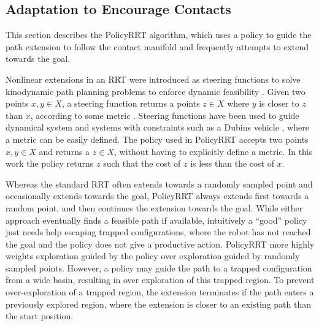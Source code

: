 \documentclass[../thesis.tex]{subfiles}
\begin{document}
\subsection{Adaptation to Encourage Contacts}
This section describes the PolicyRRT algorithm, which uses a policy to guide the path extension to follow the contact manifold and frequently attempts to extend towards the goal.

Nonlinear extensions in an RRT were introduced as steering functions to solve kinodynamic path planning problems to enforce dynamic feasibility \cite{lavalle2001randomized}.
Given two points $x,y \in X$, a steering function returns a points $z \in X$ where $y$ is closer to $z$ than $x$, according to some metric \cite{Karaman2011}.
Steering functions have been used to guide dynamical system and systems with constraints such as a Dubins vehicle \cite{karaman2011anytime}, where a metric can be easily defined.
The policy used in PolicyRRT accepts two points $x, y \in X$ and returns a $z \in X$, without having to explicitly define a metric.
In this work the policy returns $z$ such that the cost of $z$ is less than the cost of $x$.

Whereas the standard RRT often extends towards a randomly sampled point and occasionally extends towards the goal, PolicyRRT always extends first towards a random point, and then continues the extension towards the goal.
While either approach eventually finds a feasible path if available, intuitively a ``good'' policy just needs help escaping trapped configurations, where the robot has not reached the goal and the policy does not give a productive action.
PolicyRRT more highly weights exploration guided by the policy over exploration guided by randomly sampled points.
However, a policy may guide the path to a trapped configuration from a wide basin, resulting in over exploration of this trapped region.
To prevent over-exploration of a trapped region, the extension terminates if the path enters a previously explored region, where the extension is closer to an existing path than the start position.
\end{document}
